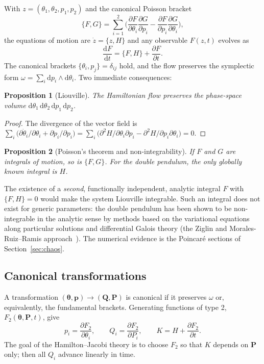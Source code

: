 \documentclass[11pt,a4paper]{book}
\newtheorem{proposition}{Proposition}[chapter]
\theoremstyle{definition}
\theoremstyle{remark}
\newcommand{\dd}{\mathrm{d}}
\newcommand{\pb}[2]{\{#1,#2\}}
\begin{document}
With $z=(\theta_1,\theta_2,p_1,p_2)$ and the canonical Poisson bracket
\begin{equation}
  \pb{F}{G}=\sum_{i=1}^{2}\Big(\frac{\partial F}{\partial\theta_i}\frac{\partial G}{\partial p_i}
  -\frac{\partial F}{\partial p_i}\frac{\partial G}{\partial\theta_i}\Big),
\end{equation}
the equations of motion are $\dot z=\pb{z}{H}$ and any observable $F(z,t)$ evolves as
\begin{equation}
  \frac{\dd F}{\dd t}=\pb{F}{H}+\frac{\partial F}{\partial t}.
\end{equation}
The canonical brackets $\pb{\theta_i}{p_j}=\delta_{ij}$ hold, and the flow preserves the symplectic form
$\omega=\sum_i\dd p_i\wedge\dd\theta_i$. Two immediate consequences:

\begin{proposition}[Liouville]
The Hamiltonian flow preserves the phase-space volume $\dd\theta_1\,\dd\theta_2\,\dd p_1\,\dd p_2$.
\end{proposition}
\begin{proof}
The divergence of the vector field is $\sum_i\big(\partial\dot\theta_i/\partial\theta_i+\partial\dot p_i/\partial p_i\big)
=\sum_i\big(\partial^2H/\partial\theta_i\partial p_i-\partial^2H/\partial p_i\partial\theta_i\big)=0$.
\end{proof}

\begin{proposition}[Poisson's theorem and non-integrability]
If $F$ and $G$ are integrals of motion, so is $\pb{F}{G}$. For the double pendulum, the only globally known integral
is $H$.
\end{proposition}
The existence of a \emph{second}, functionally independent, analytic integral $F$ with $\pb{F}{H}=0$ would make the
system Liouville integrable. Such an integral does not exist for generic parameters: the double pendulum has been shown
to be non-integrable in the analytic sense by methods based on the variational equations along particular
solutions and differential Galois theory (the Ziglin and Morales-Ruiz--Ramis approach~\cite{ziglin,moralesruiz,mrr}). The numerical evidence is
the Poincar\'e sections of Section~\ref{sec:chaos}.

\subsection{Canonical transformations}

A transformation $(\bm\theta,\bm p)\to(\bm Q,\bm P)$ is canonical if it preserves $\omega$ or, equivalently, the
fundamental brackets. Generating functions of type 2, $F_2(\bm\theta,\bm P,t)$, give
\begin{equation}
  p_i=\frac{\partial F_2}{\partial\theta_i},\qquad Q_i=\frac{\partial F_2}{\partial P_i},\qquad
  K=H+\frac{\partial F_2}{\partial t}.
  \label{eq:F2}
\end{equation}
The goal of the Hamilton--Jacobi theory is to choose $F_2$ so that $K$ depends on $\bm P$ only; then all $Q_i$
advance linearly in time.
\end{document}
